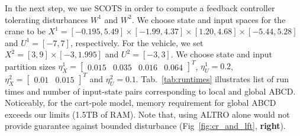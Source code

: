 In the next step, we use SCOTS in order to compute a feedback controller tolerating disturbances $W^1$ and $W^2$. %
We choose state and input spaces for the crane to be $X^{1}=[-0.195,5.49]\times[-1.99,4.37]\times[1.20,4.68]\times[-5.44,5.28]$ and $U^{1}=[-7,7]$, respectively. For the vehicle, we set $X^{2}=[3,9]\times[-3,1.995]$ and $U^{2}=[-3,3]$. %
We choose state and input partition sizes $\eta_{{X}}^{1}=\begin{bmatrix}0.015&0.035&0.016&0.064\end{bmatrix}^T$, $\eta_{U}^1=0.2$,  $\eta_{{X}}^2=\begin{bmatrix}0.01&0.015\end{bmatrix}^T$ and $\eta_{U}^2=0.1$. %
Tab.~\ref{tab:runtimes} illustrates list of run times and number of input-state pairs corresponding to local and global ABCD. Noticeably, for the cart-pole model, memory requirement for global ABCD exceeds our limits (1.5TB of RAM).  Note that, using ALTRO alone would not provide guarantee against bounded disturbance (Fig~\ref{fig:cr_and_lft}, \textbf{right}). 

